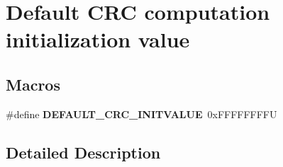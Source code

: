 \hypertarget{group___c_r_c___default___init_value}{}\section{Default C\+RC computation initialization value}
\label{group___c_r_c___default___init_value}
\subsection*{Macros}
\begin{DoxyCompactItemize}
\item 
\mbox{\label{group___c_r_c___default___init_value_gaf170c4b7a10544bf327f2605ef898f7a}} 
\#define {\bfseries D\+E\+F\+A\+U\+L\+T\+\_\+\+C\+R\+C\+\_\+\+I\+N\+I\+T\+V\+A\+L\+UE}~0x\+F\+F\+F\+F\+F\+F\+F\+FU
\end{DoxyCompactItemize}


\subsection{Detailed Description}

